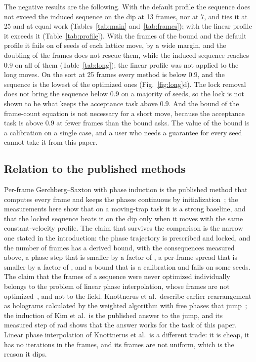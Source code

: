 The negative results are the following. With the default profile the sequence does not exceed the induced sequence on the dip at 13 frames, nor at 7, and ties it at 25 and at equal work (Tables~\ref{tab:main} and~\ref{tab:frames}); with the linear profile it exceeds it (Table~\ref{tab:profile}). With the frames of the bound and the default profile it fails on \fpeval{\longSeeds-\longAMet} of \longSeeds{} seeds of each lattice move, by a wide margin, and the doubling of the frames does not rescue them, while the induced sequence reaches $0.9$ on all of them (Table~\ref{tab:long}); the linear profile was not applied to the long moves. On the sort at 25 frames every method is below $0.9$, and the sequence is the lowest of the optimized ones (Fig.~\ref{fig:long}d). The lock removal does not bring the sequence below $0.9$ on a majority of seeds, so the lock is not shown to be what keeps the acceptance task above $0.9$. And the bound of the frame-count equation is not necessary for a short move, because the acceptance task is above $0.9$ at fewer frames than the bound asks. The value of the bound is a calibration on a single case, and a user who needs a guarantee for every seed cannot take it from this paper.

\subsection{Relation to the published methods}

Per-frame Gerchberg--Saxton with phase induction is the published method that computes every frame and keeps the phases continuous by initialization~\cite{kimoe}; the measurements here show that on a moving-trap task it is a strong baseline, and that the locked sequence beats it on the dip only when it moves with the same constant-velocity profile. The claim that survives the comparison is the narrow one stated in the introduction: the phase trajectory is prescribed and locked, and the number of frames has a derived bound, with the consequences measured above, a phase step that is smaller by a factor of \stepRatio{}, a per-frame spread that is smaller by a factor of \sigmaRatio{}, and a bound that is a calibration and fails on some seeds. The claim that the frames of a sequence were never optimized individually belongs to the problem of linear phase interpolation, whose frames are not optimized~\cite{lpi}, and not to the field. Knottnerus et al.\ describe earlier rearrangement as holograms calculated by the weighted algorithm with free phases that jump~\cite{lpi}; the induction of Kim et al.\ is the published answer to the jump, and its measured step of \accKimFiveStepMax{} rad shows that the answer works for the task of this paper. Linear phase interpolation of Knottnerus et al.\ is a different trade: it is cheap, it has no iterations in the frames, and its frames are not uniform, which is the reason it dips.

